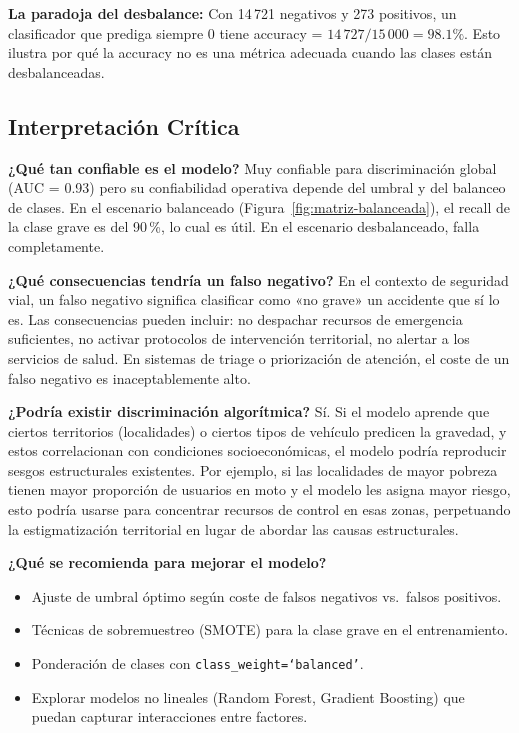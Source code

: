 \documentclass[11pt,a4paper]{article}
\begin{document}
\textbf{La paradoja del desbalance:} Con 14\,721 negativos y 273 positivos, un clasificador
que prediga siempre 0 tiene accuracy = $14\,727 / 15\,000 = 98.1\%$. Esto ilustra por
qué la accuracy no es una métrica adecuada cuando las clases están desbalanceadas.

\subsection{Interpretación Crítica}

\textbf{¿Qué tan confiable es el modelo?} Muy confiable para discriminación global (AUC =
0.93) pero su confiabilidad operativa depende del umbral y del balanceo de clases. En el
escenario balanceado (Figura~\ref{fig:matriz-balanceada}), el recall de la clase grave es
del 90\,\%, lo cual es útil. En el escenario desbalanceado, falla completamente.

\textbf{¿Qué consecuencias tendría un falso negativo?} En el contexto de seguridad vial,
un falso negativo significa clasificar como «no grave» un accidente que sí lo es. Las
consecuencias pueden incluir: no despachar recursos de emergencia suficientes, no activar
protocolos de intervención territorial, no alertar a los servicios de salud. En sistemas
de triage o priorización de atención, el coste de un falso negativo es inaceptablemente
alto.

\textbf{¿Podría existir discriminación algorítmica?} Sí. Si el modelo aprende que ciertos
territorios (localidades) o ciertos tipos de vehículo predicen la gravedad, y estos
correlacionan con condiciones socioeconómicas, el modelo podría reproducir sesgos
estructurales existentes. Por ejemplo, si las localidades de mayor pobreza tienen mayor
proporción de usuarios en moto y el modelo les asigna mayor riesgo, esto podría usarse
para concentrar recursos de control en esas zonas, perpetuando la estigmatización
territorial en lugar de abordar las causas estructurales.

\textbf{¿Qué se recomienda para mejorar el modelo?}
\begin{itemize}
  \item Ajuste de umbral óptimo según coste de falsos negativos vs.\ falsos positivos.
  \item Técnicas de sobremuestreo (SMOTE) para la clase grave en el entrenamiento.
  \item Ponderación de clases con \texttt{class\_weight=`balanced'}.
  \item Explorar modelos no lineales (Random Forest, Gradient Boosting) que puedan
        capturar interacciones entre factores.
\end{itemize}
\end{document}
